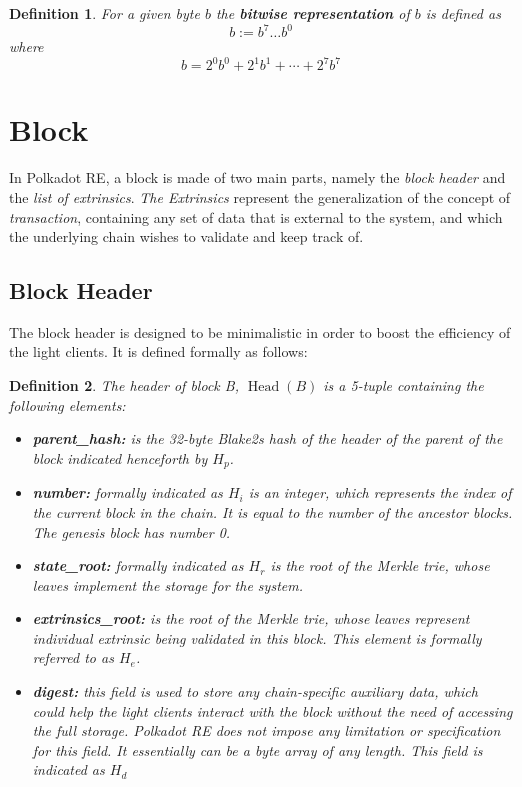 \documentclass{article}
\newcommand{\assign}{:=}
\newcommand{\tmem}[1]{{\em #1\/}}
\newcommand{\tmop}[1]{\ensuremath{\operatorname{#1}}}
\newcommand{\tmsamp}[1]{\textsf{#1}}
\newcommand{\tmstrong}[1]{\textbf{#1}}
\newcommand{\tmtextbf}[1]{{\bfseries{#1}}}
\newcommand{\tmtextit}[1]{{\itshape{#1}}}
\newtheorem{definition}{Definition}
\begin{document}
\begin{definition}
  \label{defn-bit-rep}For a given byte $b$ the {\tmstrong{bitwise
  representation}} of $b$ is defined as
  \[ b \assign b^7 \ldots b^0 \]
  where
  \[ b = 2^0 b^0 + 2^1 b^1 + \cdots + 2^7 b^7 \]
\end{definition}

\section{Block}

In Polkadot RE, a block is made of two main parts, namely the \tmtextit{block
header} and the \tmtextit{list of extrinsics}. {\tmem{The Extrinsics}}
represent the generalization of the concept of {\tmem{transaction}},
containing any set of data that is external to the system, and which the
underlying chain wishes to validate and keep track of.

\subsection{Block Header}\label{block}

The block header is designed to be minimalistic in order to boost the
efficiency of the light clients. It is defined formally as follows:

\begin{definition}
  \label{def-block-header}The header of block B, $\tmop{Head} (B)$ is a
  5-tuple containing the following elements:
  \begin{itemize}
    \item \tmtextbf{{\tmsamp{parent\_hash:}}} is the 32-byte Blake2s hash of
    the header of the parent of the block indicated henceforth by
    \tmtextbf{$H_p$}.
    
    \item {\tmstrong{{\tmsamp{number:}}}} formally indicated as
    {\tmstrong{$H_i$}} is an integer, which represents the index of the
    current block in the chain. It is equal to the number of the ancestor
    blocks. The genesis block has number 0.
    
    \item {\tmstrong{{\tmsamp{state\_root:}}}} formally indicated as
    {\tmstrong{$H_r$}} is the root of the Merkle trie, whose leaves implement
    the storage for the system.
    
    \item {\tmstrong{{\tmsamp{extrinsics\_root:}}}} is the root of the Merkle
    trie, whose leaves represent individual extrinsic being validated in this
    block. This element is formally referred to as {\tmstrong{$H_e$}}.
    
    \item {\tmstrong{{\tmsamp{digest:}}}} this field is used to store any
    chain-specific auxiliary data, which could help the light clients interact
    with the block without the need of accessing the full storage. Polkadot RE
    does not impose any limitation or specification for this field. It
    essentially can be a byte array of any length. This field is indicated as
    {\tmstrong{$H_d$}}
  \end{itemize}
\end{definition}
\end{document}
